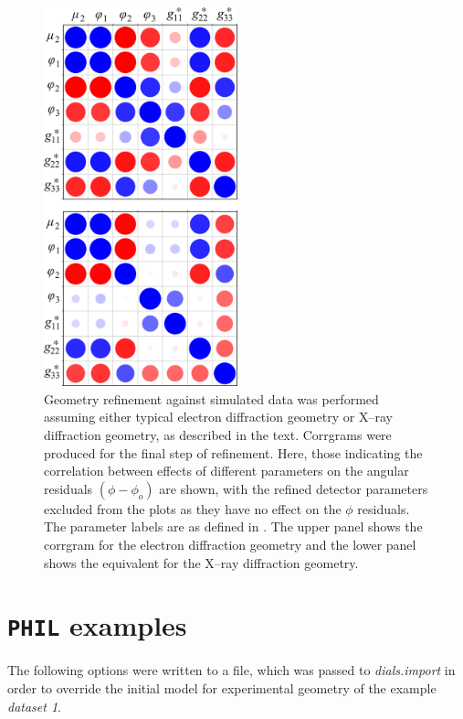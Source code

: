 \documentclass[preprint]{iucr}
\newcommand{\dialsimport}{\emph{dials.import}\xspace}
\newcommand{\code}{\texttt}
\begin{document}
\begin{figure}
  \label{fig:corrgram}
  \centering
  \caption{
    Geometry refinement against simulated data was performed assuming either
    typical electron diffraction geometry or X--ray diffraction geometry, as
    described in the text. Corrgrams were produced for the final step of
    refinement. Here, those indicating the correlation between effects of
    different parameters on the angular residuals $(\phi - \phi_o)$ are shown,
    with the refined detector parameters excluded from the plots as they have
    no effect on the $\phi$ residuals. The parameter labels are as defined in
    . The upper panel shows the corrgram for the
    electron diffraction geometry and the lower panel shows the equivalent for
    the X--ray diffraction geometry.
  }
  \includegraphics[width=0.5\textwidth]{Figures/simulation/corrgrams_phi.png}
\end{figure}

\appendix

\section{\code{PHIL} examples \label{app:PHIL_example}}

The following options were written to a file, which was passed to \dialsimport
in order to override the initial model for experimental geometry of the example
\emph{dataset 1}.
\end{document}
